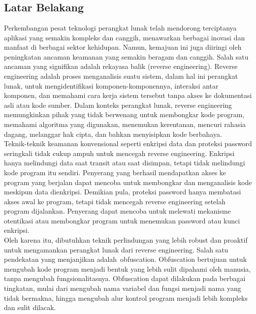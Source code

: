 \chapter{\babSatu}


\section{Latar Belakang}
Perkembangan pesat teknologi perangkat lunak telah mendorong terciptanya aplikasi yang semakin kompleks dan canggih, menawarkan berbagai inovasi dan manfaat di berbagai sektor kehidupan. Namun, kemajuan ini juga diiringi oleh peningkatan ancaman keamanan yang semakin beragam dan canggih. Salah satu ancaman yang signifikan adalah rekayasa balik (reverse engineering). Reverse engineering adalah proses menganalisis suatu sistem, dalam hal ini perangkat lunak, untuk mengidentifikasi komponen-komponennya, interaksi antar komponen, dan memahami cara kerja sistem tersebut tanpa akses ke dokumentasi asli atau kode sumber. Dalam konteks perangkat lunak, reverse engineering memungkinkan pihak yang tidak berwenang untuk membongkar kode program, memahami algoritma yang digunakan, menemukan kerentanan, mencuri rahasia dagang, melanggar hak cipta, dan bahkan menyisipkan kode berbahaya. \\

Teknik-teknik keamanan konvensional seperti enkripsi data dan proteksi password seringkali tidak cukup ampuh untuk mencegah reverse engineering. Enkripsi hanya melindungi data saat transit atau saat disimpan, tetapi tidak melindungi kode program itu sendiri. Penyerang yang berhasil mendapatkan akses ke program yang berjalan dapat mencoba untuk membongkar dan menganalisis kode meskipun data dienkripsi. Demikian pula, proteksi password hanya membatasi akses awal ke program, tetapi tidak mencegah reverse engineering setelah program dijalankan. Penyerang dapat mencoba untuk melewati mekanisme otentikasi atau membongkar program untuk menemukan password atau kunci enkripsi. \\

Oleh karena itu, dibutuhkan teknik perlindungan yang lebih robust dan proaktif untuk mengamankan perangkat lunak dari reverse engineering. Salah satu pendekatan yang menjanjikan adalah obfuscation. Obfuscation bertujuan untuk mengubah kode program menjadi bentuk yang lebih sulit dipahami oleh manusia, tanpa mengubah fungsionalitasnya. Obfuscation dapat dilakukan pada berbagai tingkatan, mulai dari mengubah nama variabel dan fungsi menjadi nama yang tidak bermakna, hingga mengubah alur kontrol program menjadi lebih kompleks dan sulit dilacak. \\

